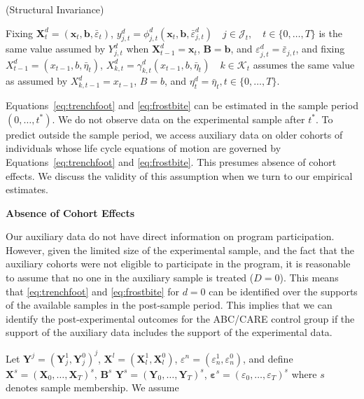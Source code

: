 \begin{assumption}\label{ass:butts}
(Structural Invariance)\\
\begin{spacing}{1.5}
\noindent Fixing $\bm{X}^d_t = (\bm{x}_t, \bm{b},\bar{\varepsilon}_t)$, $y^d_{j,t} = \phi^d_{j,t} (\bm{x}_t, \bm{b},  \bar{\varepsilon}^d_{j,t}) \quad j \in \mathcal{J}_t, \quad t \in \{0,\ldots,T\}$ is the same value assumed by $Y^d_{j,t}$ when $\bm{X}^d_{t-1} = \bm{x}_t$, $\bm{B} = \bm{b}$, and $\varepsilon^d_{j,t} = \bar{\varepsilon}_{j,t}$, and fixing $X^d_{t-1} = (x_{t-1}, b, \bar{\eta}_t)$, $X^d_{k,t} = \gamma^d_{k,t} (x_{t-1}, b, \bar{\eta}_t) \quad k \in \mathcal{K}_t$ assumes the same value as assumed by $X^d_{k,t-1} = x_{t-1}$, $B = b$, and $\eta^d_t = \bar{\eta}_t, t \in \{0,\dots,T\}$.
\end{spacing}
\end{assumption}

Equations~\eqref{eq:trenchfoot} and \eqref{eq:frostbite} can be estimated in the sample period $(0,\ldots,t^{*})$. We do not observe data on the experimental sample after $t^{*}$. To predict outside the sample period, we access auxiliary data on older cohorts of individuals whose life cycle equations of motion are governed by Equations~\eqref{eq:trenchfoot} and \eqref{eq:frostbite}. This presumes absence of cohort effects. We discuss the validity of this assumption when we turn to our empirical estimates.

\begin{assumption}\label{ass:crotchrot}
\textbf{Absence of Cohort Effects}
\end{assumption}

Our auxiliary data do not have direct information on program participation. However, given the limited size of the experimental sample, and the fact that the auxiliary cohorts were not eligible to participate in the program, it is reasonable to assume that no one in the auxiliary sample is treated ($D=0$). This means that \eqref{eq:trenchfoot} and \eqref{eq:frostbite} for $d=0$ can be identified over the supports of the available samples in the post-sample period. This implies that we can identify the post-experimental outcomes for the ABC/CARE control group if the support of the auxiliary data includes the support of the experimental data.

Let $\bm{Y}^j = (\bm{Y}^1_j, \bm{Y}^0_j)^j$, $\bm{X}^l = (\bm{X}^1_l, \bm{X}^0_l)$, $\varepsilon^n = (\varepsilon^1_n, \varepsilon^0_n)$, and define $\bm{X}^s = (\bm{X}_0,\dots,\bm{X}_T)^s$, $\bm{B}^s$ $\bm{Y}^s = (\bm{Y}_0,\dots,\bm{Y}_T)^s$, $\bm{\varepsilon}^s = (\varepsilon_0,\dots,\varepsilon_{T})^s$ where $s$ denotes sample membership. We assume

